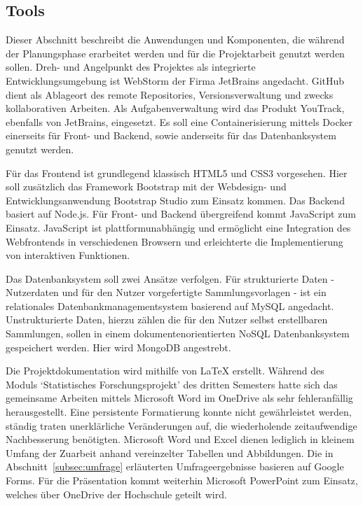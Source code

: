 \subsection{Tools}\label{subsec:Tools}
Dieser Abschnitt beschreibt die Anwendungen und Komponenten, die während der Planungsphase erarbeitet werden und für die Projektarbeit genutzt werden sollen.
Dreh- und Angelpunkt des Projektes als integrierte Entwicklungsumgebung ist WebStorm der Firma JetBrains angedacht.
GitHub dient als Ablageort des remote Repositories, Versionsverwaltung und zwecks kollaborativen Arbeiten.
Als Aufgabenverwaltung wird das Produkt YouTrack, ebenfalls von JetBrains, eingesetzt.
Es soll eine Containerisierung mittels Docker einerseits für Front- und Backend, sowie anderseits für das Datenbanksystem genutzt werden.

Für das Frontend ist grundlegend klassisch HTML5 und CSS3 vorgesehen.
Hier soll zusätzlich das Framework Bootstrap mit der Webdesign- und Entwicklungsanwendung Bootstrap Studio zum Einsatz kommen.
Das Backend basiert auf Node.js.
Für Front- und Backend übergreifend kommt JavaScript zum Einsatz.
JavaScript ist plattformunabhängig und ermöglicht eine Integration des Webfrontends in verschiedenen Browsern und erleichterte die Implementierung von interaktiven Funktionen.

Das Datenbanksystem soll zwei Ansätze verfolgen.
Für strukturierte Daten - Nutzerdaten und für den Nutzer vorgefertigte Sammlungsvorlagen - ist ein relationales Datenbankmanagementsystem basierend auf MySQL angedacht.
Unstrukturierte Daten, hierzu zählen die für den Nutzer selbst erstellbaren Sammlungen, sollen in einem dokumentenorientierten NoSQL Datenbanksystem gespeichert werden.
Hier wird MongoDB angestrebt.

Die Projektdokumentation wird mithilfe von LaTeX erstellt.
Während des Moduls `Statistisches Forschungsprojekt' des dritten Semesters hatte sich das gemeinsame Arbeiten mittels Microsoft Word im OneDrive als sehr fehleranfällig herausgestellt.
Eine persistente Formatierung konnte nicht gewährleistet werden, ständig traten unerklärliche Veränderungen auf, die wiederholende zeitaufwendige Nachbesserung benötigten.
Microsoft Word und Excel dienen lediglich in kleinem Umfang der Zuarbeit anhand vereinzelter Tabellen und Abbildungen.
Die in Abschnitt~\ref{subsec:umfrage} erläuterten Umfrageergebnisse basieren auf Google Forms.
Für die Präsentation kommt weiterhin Microsoft PowerPoint zum Einsatz, welches über OneDrive der Hochschule geteilt wird.

